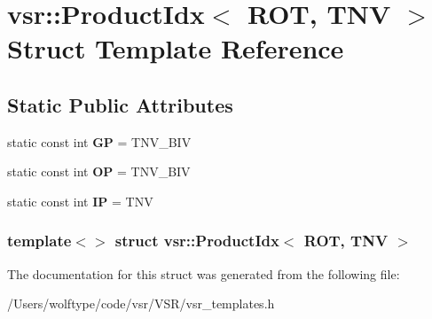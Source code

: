 \hypertarget{structvsr_1_1_product_idx_3_01_r_o_t_00_01_t_n_v_01_4}{\section{vsr\-:\-:Product\-Idx$<$ R\-O\-T, T\-N\-V $>$ Struct Template Reference}
\label{structvsr_1_1_product_idx_3_01_r_o_t_00_01_t_n_v_01_4}
}
\subsection*{Static Public Attributes}
\begin{DoxyCompactItemize}
\item 
\hypertarget{structvsr_1_1_product_idx_3_01_r_o_t_00_01_t_n_v_01_4_a8edb4dc191cfea225662ec27806b9a6f}{static const int {\bfseries G\-P} = T\-N\-V\-\_\-\-B\-I\-V}\label{structvsr_1_1_product_idx_3_01_r_o_t_00_01_t_n_v_01_4_a8edb4dc191cfea225662ec27806b9a6f}

\item 
\hypertarget{structvsr_1_1_product_idx_3_01_r_o_t_00_01_t_n_v_01_4_a6f0b930d9f93ce0f6a7888c0ca65272c}{static const int {\bfseries O\-P} = T\-N\-V\-\_\-\-B\-I\-V}\label{structvsr_1_1_product_idx_3_01_r_o_t_00_01_t_n_v_01_4_a6f0b930d9f93ce0f6a7888c0ca65272c}

\item 
\hypertarget{structvsr_1_1_product_idx_3_01_r_o_t_00_01_t_n_v_01_4_ab9b20f46c7fcfdf7fb2a42c4dac3d387}{static const int {\bfseries I\-P} = T\-N\-V}\label{structvsr_1_1_product_idx_3_01_r_o_t_00_01_t_n_v_01_4_ab9b20f46c7fcfdf7fb2a42c4dac3d387}

\end{DoxyCompactItemize}
\subsubsection*{template$<$$>$ struct vsr\-::\-Product\-Idx$<$ R\-O\-T, T\-N\-V $>$}



The documentation for this struct was generated from the following file\-:\begin{DoxyCompactItemize}
\item 
/\-Users/wolftype/code/vsr/\-V\-S\-R/vsr\-\_\-templates.\-h\end{DoxyCompactItemize}
